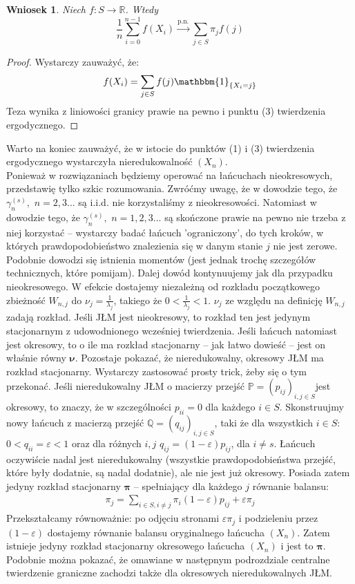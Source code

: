 \documentclass[a4paper]{article}
\theoremstyle{defn}
\theoremstyle{theorem}
\theoremstyle{lemma}
\theoremstyle{cor}
\newtheorem{cor}[defn]{Wniosek}
\theoremstyle{fact}
\begin{document}
\begin{cor}\label{cor2.5.14}
Niech $f: S \to \mathbb{R}$. Wtedy
$$ \frac{1}{n} \sum\limits_{i=0}^{n-1} f(X_i) \overset{\text{p.n.}}{\to} \sum\limits_{j \in S} \pi_j f(j)$$
\end{cor}
\begin{proof}
Wystarczy zauważyć, że:
$$ f(X_i) = \sum\limits_{j \in S} f(j)\mathbbm{1}_{\{X_i = j\}}$$
Teza wynika z liniowości granicy prawie na pewno i punktu (3) twierdzenia ergodycznego.
\end{proof}
Warto na koniec zauważyć, że w istocie do punktów (1) i (3) twierdzenia ergodycznego wystarczyła nieredukowalność $(X_n)$. \\
Ponieważ w rozwiązaniach będziemy operować na łańcuchach nieokresowych, przedstawię tylko szkic rozumowania. Zwróćmy uwagę, że w dowodzie tego, że $\gamma_n^{(s)},\,\, n = 2,3...$ są i.i.d. nie korzystaliśmy z nieokresowości. Natomiast w dowodzie tego, że $\gamma_n^{(s)},\,\, n = 1,2,3...$ są skończone prawie na pewno nie trzeba z niej korzystać – wystarczy badać łańcuch 'ograniczony', do tych kroków, w których prawdopodobieństwo znalezienia się w danym stanie $j$ nie jest zerowe. Podobnie dowodzi się istnienia momentów (jest jednak trochę szczegółów technicznych, które pomijam). Dalej dowód kontynuujemy jak dla przypadku nieokresowego. W efekcie dostajemy niezależną od rozkładu początkowego zbieżność $W_{n,j}$ do $\nu_j = \frac{1}{\lambda_j}$, takiego że $0 < \frac{1}{\lambda_j} < 1$. $\nu_j$ ze względu na definicję $W_{n,j}$ zadają rozkład. Jeśli JŁM jest nieokresowy, to rozkład ten jest jedynym stacjonarnym z udowodnionego wcześniej twierdzenia. Jeśli łańcuch natomiast jest okresowy, to o ile ma rozkład stacjonarny – jak łatwo dowieść – jest on właśnie równy $\boldsymbol{\nu}$. Pozostaje pokazać, że nieredukowalny, okresowy JŁM ma rozkład stacjonarny. Wystarczy zastosować prosty trick, żeby się o tym przekonać. Jeśli nieredukowalny JŁM o macierzy przejść $\mathbb{P} = (p_{ij})_{i,j \in S}$jest okresowy, to znaczy, że w szczególności $p_{ii} = 0$ dla każdego $i \in S$. Skonstruujmy nowy łańcuch z macierzą przejść $\mathbb{Q} = (q_{ij})_{i,j \in S}$, taki że dla wszystkich $i \in S$: $0 < q_{ii} = \varepsilon < 1$ oraz dla różnych $i,j$ $q_{ij} = (1-\varepsilon)p_{ij}$, dla $i \neq s$. Łańcuch oczywiście nadal jest nieredukowalny (wszystkie prawdopodobieństwa przejść, które były dodatnie, są nadal dodatnie), ale nie jest już okresowy. Posiada zatem jedyny rozkład stacjonarny $\boldsymbol{\pi}$ – spełniający dla każdego $j$ równanie balansu:
\begin{align*}
    \pi_j = \sum\limits_{i \in S, i \neq j} \pi_i (1-\varepsilon) p_{ij}  + \varepsilon \pi_j
\end{align*}
Przekształcamy równoważnie: po odjęciu stronami $\varepsilon \pi_j$ i podzieleniu przez $(1-\varepsilon)$ dostajemy równanie balansu oryginalnego łańcucha $(X_n)$. Zatem istnieje jedyny rozkład stacjonarny okresowego łańcucha $(X_n)$ i jest to $\boldsymbol{\pi}$.
\\
Podobnie można pokazać, że omawiane w następnym podrozdziale centralne twierdzenie graniczne zachodzi także dla okresowych nieredukowalnych JŁM.
\end{document}
